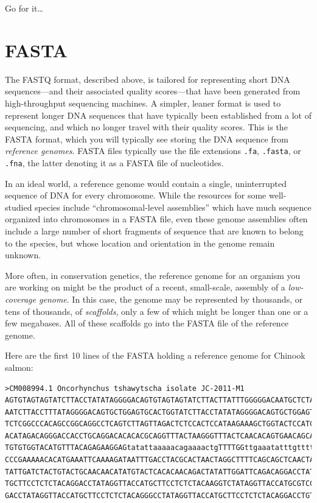 \documentclass[]{krantz}
\begin{document}
Go for it\ldots{}

\hypertarget{fasta}{%
\section{FASTA}\label{fasta}}

The FASTQ format, described above, is tailored for representing short DNA sequences---and their associated
quality scores---that have been generated from high-throughput sequencing machines.
A simpler, leaner format is used to represent longer DNA sequences that have typically
been established from a lot of sequencing, and which no longer travel with their
quality scores. This is the FASTA format, which you will typically see storing
the DNA sequence from \emph{reference genomes}. FASTA files typically use the file extensions \texttt{.fa}, \texttt{.fasta},
or \texttt{.fna}, the latter denoting it as a FASTA file of nucleotides.

In an ideal world, a reference genome
would contain a single, uninterrupted sequence of DNA for every chromosome. While the resources
for some well-studied species include ``chromosomal-level assemblies'' which have much
sequence organized into chromosomes in a FASTA file, even these genome assemblies often
include a large number of short fragments of sequence that are known to belong
to the species, but whose location and orientation in the genome remain unknown.

More often, in conservation genetics, the reference genome for an organism you are working
on might be the product of a recent, small-scale, assembly of a \emph{low-coverage genome}.
In this case, the genome may be represented by thousands, or tens of thousands, of \emph{scaffolds},
only a few of which might be longer than one or a few megabases. All of these scaffolds
go into the FASTA file of the reference genome.

Here are the first 10 lines of the FASTA holding a reference genome for
Chinook salmon:

\begin{verbatim}
>CM008994.1 Oncorhynchus tshawytscha isolate JC-2011-M1
AGTGTAGTAGTATCTTACCTATATAGGGGACAGTGTAGTAGTATCTTACTTATTTGGGGGACAATGCTCTAGTGTAGTAG
AATCTTACCTTTATAGGGGACAGTGCTGGAGTGCACTGGTATCTTACCTATATAGGGGACAGTGCTGGAGTGTAGTAGTG
TCTCGGCCCACAGCCGGCAGGCCTCAGTCTTAGTTAGACTCTCCACTCCATAAGAAAGCTGGTACTCCATCTTGGACAGG
ACATAGACAGGGACCACCTGCAGGACACACACGCAGGTTTACTAAGGGTTTACTCAACACAGTGAACAGCATATACCAGA
TGTGTGGTACATGTTTACAGAGAAGGAGtatattaaaaacagaaaactgTTTTGGttgaaatatttgtttttgtctgaAG
CCCGAAAAACACATGAAATTCAAAAGATAATTTGACCTACGCACTAACTAGGCTTTTCAGCAGCTCAACTACTGTCCGTT
TATTGATCTACTGTACTGCAACAACATATGTACTCACACAACAGACTATATTGGATTCAGACAGGACCTATAGGTTACCA
TGCTTCCTCTCTACAGGACCTATAGGTTACCATGCTTCCTCTCTACAAGGTCTATAGGTTACCATGCGTCCTCTCTACAG
GACCTATAGGTTACCATGCTTCCTCTCTACAGGGCCTATAGGTTACCATGCTTCCTCTCTACAGGACCTGTAGGTTACCA
\end{verbatim}
\end{document}
